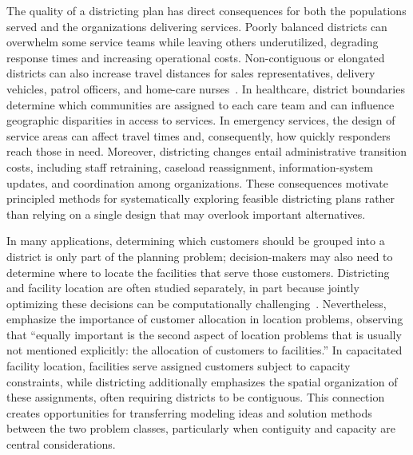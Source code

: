 \documentclass[11pt]{article}
\theoremstyle{definition}
\begin{document}
The quality of a districting plan has direct consequences for both the populations 
served and the organizations delivering services. Poorly balanced districts can 
overwhelm some service teams while leaving others underutilized, degrading response 
times and increasing operational costs. Non-contiguous or elongated districts can 
also increase travel distances for sales representatives, delivery vehicles, patrol 
officers, and home-care nurses~\citep{kalcsics2020districting}. In healthcare, 
district boundaries determine which communities are assigned to each care team and 
can influence geographic disparities in access to services. In emergency services, 
the design of service areas can affect travel times and, consequently, how quickly 
responders reach those in need. Moreover, districting changes entail administrative 
transition costs, including staff retraining, caseload reassignment, information-system
updates, and coordination among organizations. These consequences motivate principled 
methods for systematically exploring feasible districting plans rather than relying 
on a single design that may overlook important alternatives.

In many applications, determining which customers should be grouped into a district 
is only part of the planning problem; decision-makers may also need to determine 
where to locate the facilities that serve those customers. Districting and facility 
location are often studied separately, in part because jointly optimizing these 
decisions can be computationally challenging~\citep{kalcsics2005towards}. Nevertheless, 
\citet{kalcsics2020districting} emphasize the importance of customer 
allocation in location problems, observing that ``equally important is the second 
aspect of location problems that is usually not mentioned explicitly: the allocation 
of customers to facilities.'' In capacitated facility location, facilities serve 
assigned customers subject to capacity constraints, while districting additionally 
emphasizes the spatial organization of these assignments, often requiring districts 
to be contiguous. This connection creates opportunities for transferring modeling 
ideas and solution methods between the two problem classes, particularly when 
contiguity and capacity are central considerations.
\end{document}
